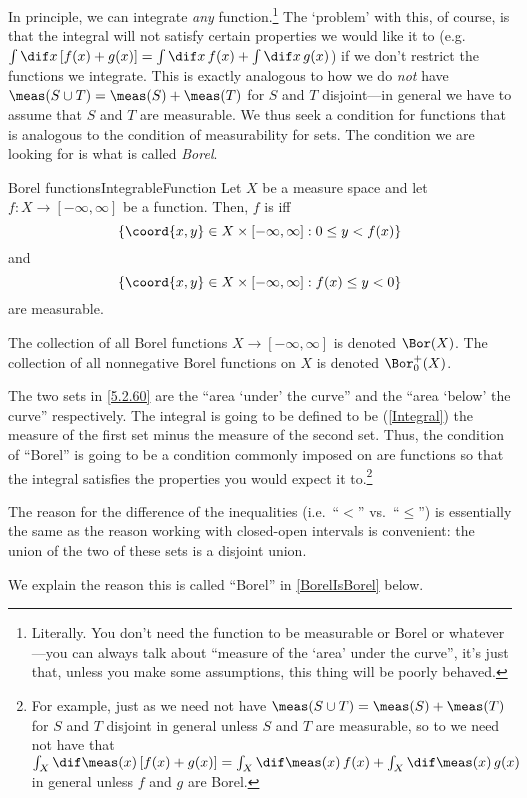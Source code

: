 In principle, we can integrate \emph{any} function.\footnote{Literally.  You don't need the function to be measurable or Borel or whatever---you can always talk about ``measure of the `area' under the curve'', it's just that, unless you make some assumptions, this thing will be poorly behaved.}  The `problem' with this, of course, is that the integral will not satisfy certain properties we would like it to (e.g.~$\int \dif x\, [f(x)+g(x)]=\int \dif x\, f(x)+\int \dif x\, g(x)$) if we don't restrict the functions we integrate.  This is exactly analogous to how we do \emph{not} have $\meas (S\cup T)=\meas (S)+\meas (T)$ for $S$ and $T$ disjoint---in general we have to assume that $S$ and $T$ are measurable.  We thus seek a condition for functions that is analogous to the condition of measurability for sets.  The condition we are looking for is what is called \emph{Borel}.
\begin{dfn}{Borel functions}{IntegrableFunction}
Let $X$ be a measure space and let $f\colon X\rightarrow [-\infty ,\infty ]$ be a function.  Then, $f$ is  iff
\begin{equation}\label{5.2.60}
\{ \coord{x,y}\in X\times [-\infty ,\infty ]:0\leq y<f(x)\}
\end{equation}
and
\begin{equation}
\{ \coord{x,y}\in X\times [-\infty ,\infty ]:f(x)\leq y<0\}
\end{equation}
are measurable.
\begin{rmk}
The collection of all Borel functions $X\rightarrow [-\infty ,\infty]$ is denoted $\Bor (X)$.  The collection of all nonnegative Borel functions on $X$ is denoted $\Bor _0^+(X)$. 
\end{rmk}
\begin{rmk}
The two sets in \eqref{5.2.60} are the ``area `under' the curve'' and the ``area `below' the curve'' respectively.  The integral is going to be defined to be (\cref{Integral}) the measure of the first set minus the measure of the second set.  Thus, the condition of ``Borel'' is going to be a condition commonly imposed on are functions so that the integral satisfies the properties you would expect it to.\footnote{For example, just as we need not have $\meas (S\cup T)=\meas (S)+\meas (T)$ for $S$ and $T$ disjoint in general unless $S$ and $T$ are measurable, so to we need not have that $\int _X\dif \meas (x)\, [f(x)+g(x)]=\int _X\dif \meas (x)\, f(x)+\int _X\dif \meas (x)\, g(x)$ in general unless $f$ and $g$ are Borel.}
\end{rmk}
\begin{rmk}
The reason for the difference of the inequalities (i.e.\ ``$<$'' vs.\ ``$\leq $'') is essentially the same as the reason working with closed-open intervals is convenient:  the union of the two of these sets is a disjoint union.
\end{rmk}
\begin{rmk}
We explain the reason this is called ``Borel'' in \cref{BorelIsBorel} below.
\end{rmk}
\end{dfn}
